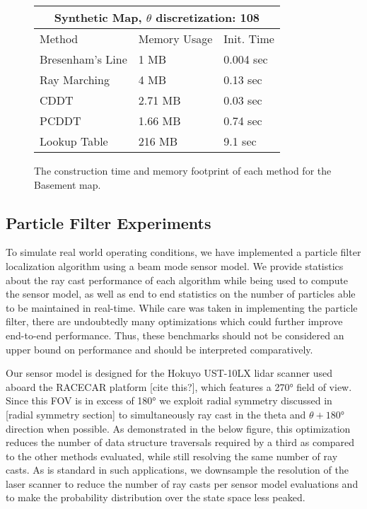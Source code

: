\documentclass[letterpaper, 10 pt, conference]{ieeeconf}  %
\begin{document}
\begin{figure}[h]
\begin{center}
\begin{tabular}{ | m{8em} | m{2.3cm}| m{1.5cm} | } 
\hline
 \multicolumn{3}{|c|}{Synthetic Map, $\theta$ discretization: 108} \\
 \hline
 Method & Memory Usage & Init. Time \\
 \hline
 Bresenham's Line & 1 MB & 0.004 sec  \\
 Ray Marching  & 4 MB & 0.13 sec  \\
 CDDT & 2.71 MB & 0.03 sec  \\
 PCDDT & 1.66 MB & 0.74 sec  \\
 Lookup Table & 216 MB & 9.1 sec  \\
\hline
\end{tabular}
\end{center}
\caption{The construction time and memory footprint of each method for the Basement map.}
\label{table:basement:init}
\end{figure}

\subsection{Particle Filter Experiments}

To simulate real world operating conditions, we have implemented a particle filter localization algorithm using a beam mode sensor model. We provide statistics about the ray cast performance of each algorithm while being used to compute the sensor model, as well as end to end statistics on the number of particles able to be maintained in real-time. While care was taken in implementing the particle filter, there are undoubtedly many optimizations which could further improve end-to-end performance. Thus, these benchmarks should not be considered an upper bound on performance and should be interpreted comparatively.

Our sensor model is designed for the Hokuyo UST-10LX lidar scanner used aboard the RACECAR platform [cite this?], which features a 270° field of view. Since this FOV is in excess of 180° we exploit radial symmetry discussed in [radial symmetry section] to simultaneously ray cast in the theta and $\theta+180°$ direction when possible. As demonstrated in the below figure, this optimization reduces the number of data structure traversals required by a third as compared to the other methods evaluated, while still resolving the same number of ray casts. As is standard in such applications, we downsample the resolution of the laser scanner to reduce the number of ray casts per sensor model evaluations and to make the probability distribution over the state space less peaked.
\end{document}
